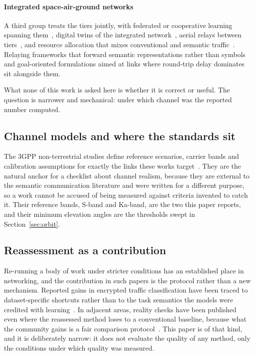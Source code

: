 \documentclass[preprint,11pt,3p]{elsarticle}
\begin{document}
\paragraph{Integrated space-air-ground networks}
A third group treats the tiers jointly, with federated or cooperative learning spanning
them~\cite{nguyen2025r104,razlighi2026r118}, digital twins of the integrated
network~\cite{qiu2025r200}, aerial relays between tiers~\cite{yin2025r203}, and resource
allocation that mixes conventional and semantic
traffic~\cite{huang2024r112,zhao2024r114,nguyenkha2026r170}. Relaying frameworks that forward
semantic representations rather than symbols~\cite{lin2023r116} and goal-oriented formulations
aimed at links where round-trip delay dominates~\cite{uysal2024r108} sit alongside them.

What none of this work is asked here is whether it is correct or useful. The question is
narrower and mechanical: under which channel was the reported number computed.

\subsection{Channel models and where the standards sit}

The 3GPP non-terrestrial studies define reference scenarios, carrier bands and calibration
assumptions for exactly the links these works target~\cite{tr38811,tr38821}. They are the natural
anchor for a checklist about channel realism, because they are external to the semantic
communication literature and were written for a different purpose, so a work cannot be accused of
being measured against criteria invented to catch it. Their reference bands, S-band and Ka-band,
are the two this paper reports, and their minimum elevation angles are the thresholds swept in
Section~\ref{sec:orbit}.

\subsection{Reassessment as a contribution}

Re-running a body of work under stricter conditions has an established place in networking, and
the contribution in such papers is the protocol rather than a new mechanism. Reported gains in
encrypted traffic classification have been traced to dataset-specific shortcuts rather than to
the task semantics the models were credited with learning~\cite{shortcuts2026}. In adjacent
areas, reality checks have been published even where the reassessed method loses to a
conventional baseline, because what the community gains is a fair comparison
protocol~\cite{spadari2025realitycheck}. This paper is of that kind, and it is deliberately
narrow: it does not evaluate the quality of any method, only the conditions under which quality
was measured.
\end{document}
